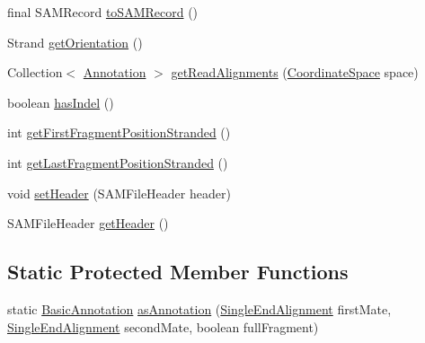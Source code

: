 \begin{DoxyCompactItemize}
\item 
final S\+A\+M\+Record \hyperlink{classumms_1_1core_1_1alignment_1_1_abstract_paired_end_alignment_a07764ea4c818de84cac405e4d3d1ae73}{to\+S\+A\+M\+Record} ()
\item 
Strand \hyperlink{classumms_1_1core_1_1alignment_1_1_abstract_paired_end_alignment_a6c978b97041609bfee866d81de3db450}{get\+Orientation} ()
\item 
Collection$<$ \hyperlink{interfaceumms_1_1core_1_1annotation_1_1_annotation}{Annotation} $>$ \hyperlink{classumms_1_1core_1_1alignment_1_1_abstract_paired_end_alignment_a83479cb561a7d49efef887022b69c1c7}{get\+Read\+Alignments} (\hyperlink{interfaceumms_1_1core_1_1coordinatesystem_1_1_coordinate_space}{Coordinate\+Space} space)
\item 
boolean \hyperlink{classumms_1_1core_1_1alignment_1_1_abstract_paired_end_alignment_a8582465192325acb5ea647e5ad636a97}{has\+Indel} ()
\item 
int \hyperlink{classumms_1_1core_1_1alignment_1_1_abstract_paired_end_alignment_a6a0100ecd7ccbbfa99b2fdbce249264b}{get\+First\+Fragment\+Position\+Stranded} ()
\item 
int \hyperlink{classumms_1_1core_1_1alignment_1_1_abstract_paired_end_alignment_a74011edfb3ccb6915bea34da9d73e3c7}{get\+Last\+Fragment\+Position\+Stranded} ()
\item 
void \hyperlink{classumms_1_1core_1_1alignment_1_1_abstract_paired_end_alignment_aac3271f5fbb76f0150766972b37b3e91}{set\+Header} (S\+A\+M\+File\+Header header)
\item 
S\+A\+M\+File\+Header \hyperlink{classumms_1_1core_1_1alignment_1_1_abstract_paired_end_alignment_a7c244aba0fae3e4a4affd9a2d018c888}{get\+Header} ()
\end{DoxyCompactItemize}
\subsection*{Static Protected Member Functions}
\begin{DoxyCompactItemize}
\item 
static \hyperlink{classumms_1_1core_1_1annotation_1_1_basic_annotation}{Basic\+Annotation} \hyperlink{classumms_1_1core_1_1alignment_1_1_abstract_paired_end_alignment_a27d82ac9daf62cf46f5385d770efc69c}{as\+Annotation} (\hyperlink{classumms_1_1core_1_1alignment_1_1_single_end_alignment}{Single\+End\+Alignment} first\+Mate, \hyperlink{classumms_1_1core_1_1alignment_1_1_single_end_alignment}{Single\+End\+Alignment} second\+Mate, boolean full\+Fragment)
\end{DoxyCompactItemize}
